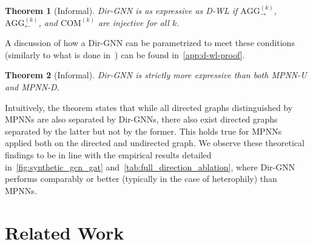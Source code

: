 \documentclass{article}
\newcommand{\inp}{\leftarrow}
\newcommand{\out}{\rightarrow}
\newcommand\oursacro{Dir-GNN}
\theoremstyle{plain}
\newtheorem{theorem}{Theorem}[section]
\theoremstyle{definition}
\theoremstyle{remark}
\begin{document}
\begin{theorem}[Informal]\label{thm:dirgnn-as-expressive-as-d-wl}
    \oursacro{} is as expressive as D-WL if $\mathrm{AGG}^{(k)}_{\out}$, $\mathrm{AGG}^{(k)}_{\inp}$, and $\mathrm{COM}^{(k)}$ are injective for all $k$. 
\end{theorem}

A discussion of how a \oursacro{} can be parametrized to meet these conditions (similarly to what is done in~\citet{DBLP:conf/iclr/XuHLJ19}) can be found in~\cref{app:d-wl-proof}.

\begin{theorem}[Informal]\label{thm:dirgnn-strictly-more-expressive-than-mpnn}
\oursacro{} is strictly more expressive than both MPNN-U and MPNN-D.
\end{theorem}

Intuitively, the theorem states that while all directed graphs distinguished by MPNNs are also separated by \oursacro{}s, there also exist directed graphs separated by the latter but not by the former. This holds true for  MPNNs applied both on the directed and undirected graph.
We observe these theoretical findings to be in line with the empirical results detailed in~\cref{fig:synthetic_gcn_gat} and~\cref{tab:full_direction_ablation}, where \oursacro{} performs comparably or better (typically in the case of heterophily) than MPNNs. \section{Related Work}
\label{sec:related_work}
\end{document}
